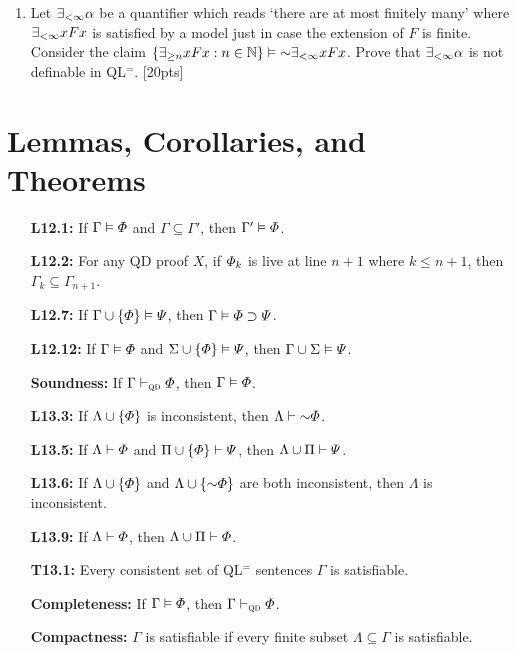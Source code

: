 \documentclass[12pt]{article}
\begin{document}
\begin{enumerate}
  \item Let $\exists_{<\infty} \alpha$ be a quantifier which reads `there are at most finitely many' where $\exists_{<\infty} xFx$ is satisfied by a model just in case the extension of $F$ is finite. 
    Consider the claim $\set{\qt{\exists_{\geq n}}{x}Fx:n\in\N}\vDash\enot \qt{\exists_{<\infty}}{x}Fx$. 
    Prove that $\exists_{<\infty} \alpha$ is not definable in QL$^=$. [20pts]

\end{enumerate}





\section*{Lemmas, Corollaries, and Theorems}


\begin{enumerate}[itemsep=0in,leftmargin=.75in]
\item[\bf L12.1:] If $\Gamma \vDash \varPhi$ and $\Gamma \subseteq \Gamma'$, then $\Gamma' \vDash \varPhi$.
\item[\bf L12.2:] For any QD proof $X$, if $\varPhi_k$ is live at line $n+1$ where $k\leq n+1$, then $\Gamma_k\subseteq \Gamma_{n+1}$.
\item[\bf L12.7:] If $\Gamma \cup \lbrace\varPhi\rbrace \vDash \varPsi$, then $\Gamma \vDash \varPhi \supset \varPsi$.
\item[\bf L12.12:] If $\Gamma \vDash \varPhi$ and $\Sigma \cup \lbrace\varPhi\rbrace \vDash \varPsi$, then $\Gamma\cup\Sigma \vDash \varPsi$.
\item[\bf Soundness:] If $\Gamma\vdash_{\textsc{qd}}\varPhi$, then $\Gamma\vDash\varPhi$.
\item[\bf L13.3:] If $\Lambda\cup\lbrace\varPhi\rbrace$ is inconsistent, then $\Lambda\proves\enot\metaA$.
\item[\bf L13.5:] If $\Lambda \vdash \varPhi$ and $\Pi\cup\lbrace\varPhi\rbrace \vdash \varPsi$, then $\Lambda\cup\Pi \vdash \varPsi$.
\item[\bf L13.6:] If $\Lambda \cup \lbrace\varPhi\rbrace$ and $\Lambda\cup \set{\enot\metaA}$ are both inconsistent, then $\Lambda$ is inconsistent.
\item[\bf L13.9:] If $\Lambda\vdash\varPhi$, then $\Lambda\cup\Pi\vdash\varPhi$.
\item[\bf T13.1:] Every consistent set of QL$^=$ sentences $\Gamma$ is satisfiable.
\item[\bf Completeness:] If $\Gamma\vDash\varPhi$, then $\Gamma\vdash_{\textsc{qd}}\varPhi$.
\item[\bf Compactness:] $\Gamma$ is satisfiable if every finite subset $\Lambda\subseteq\Gamma$ is satisfiable.
\end{enumerate}
\end{document}
